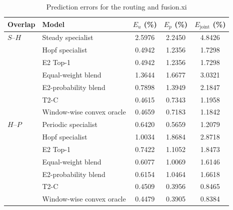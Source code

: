 \begin{table}[htbp]
\centering
\caption{Prediction errors for the routing and fusion.xi}
\label{tab:centered_square_fusion_aggregate}

\small
\renewcommand{\arraystretch}{1.10}
\setlength{\tabcolsep}{8pt}

\begin{tabular}{@{}llccc@{}}
\toprule
Overlap
& Model
& $E_u$ (\%)
& $E_p$ (\%)
& $E_{\mathrm{joint}}$ (\%) \\
\midrule

$S$--$H$
& Steady specialist
& 2.5976
& 2.2450
& 4.8426 \\

& Hopf specialist
& 0.4942
& 1.2356
& 1.7298 \\

& E2 Top-1
& 0.4942
& 1.2356
& 1.7298 \\

& Equal-weight blend
& 1.3644
& 1.6677
& 3.0321 \\

& E2-probability blend
& 0.7898
& 1.3949
& 2.1847 \\

& T2-C
& 0.4615
& 0.7343
& 1.1958 \\

& Window-wise convex oracle
& 0.4659
& 0.7183
& 1.1842 \\

\midrule

$H$--$P$
& Periodic specialist
& 0.6420
& 0.5659
& 1.2079 \\

& Hopf specialist
& 1.0034
& 1.8684
& 2.8718 \\

& E2 Top-1
& 0.7422
& 1.1052
& 1.8473 \\

& Equal-weight blend
& 0.6077
& 1.0069
& 1.6146 \\

& E2-probability blend
& 0.6154
& 1.0464
& 1.6618 \\

& T2-C
& 0.4509
& 0.3956
& 0.8465 \\

& Window-wise convex oracle
& 0.4479
& 0.3905
& 0.8384 \\

\bottomrule
\end{tabular}
\end{table}

